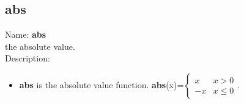 \subsection{abs}
\label{lababs}
\noindent Name: \textbf{abs}\\
the absolute value.\\

\noindent Description: \begin{itemize}

\item \textbf{abs} is the absolute value function. \textbf{abs}(x)=$\left \lbrace \begin{array}{rl} x & x > 0 \\ -x & x \leq 0 \end{array}  \right.$.
\end{itemize}
